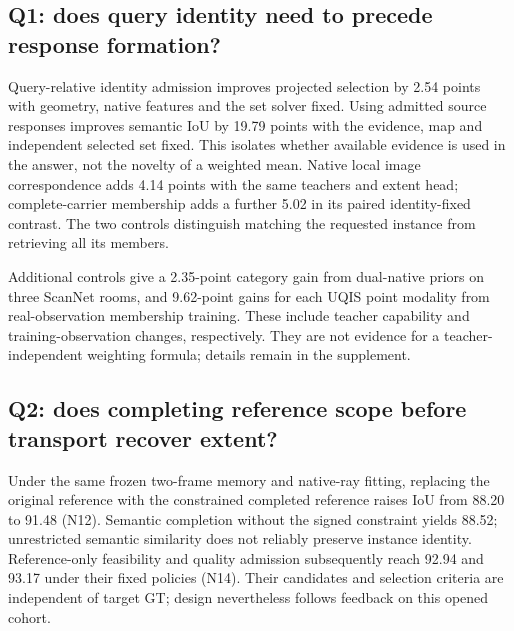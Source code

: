 \subsection{Q1: does query identity need to precede response formation?}
\begin{table}[ht]
\centering\small\resizebox{\linewidth}{!}{}
\caption{Historical matched component controls in our method. The first two
rows measure LERF selected projection and semantic IoU, respectively; the last
two measure UQIS actual image-instance IoU. These interventions are non-additive
and are not final-system leave-one-module-out experiments.}
\label{tab:core-components}
\end{table}
Query-relative identity admission improves projected selection by 2.54 points
with geometry, native features and the set solver fixed. Using admitted source
responses improves semantic IoU by 19.79 points with the evidence, map and
independent selected set fixed. This isolates whether available evidence is
used in the answer, not the novelty of a weighted mean.
Native local image correspondence adds 4.14 points with the same teachers and
extent head; complete-carrier membership adds a further 5.02 in its paired
identity-fixed contrast. The two controls distinguish matching the requested
instance from retrieving all its members.

Additional controls give a 2.35-point category gain from dual-native priors on
three ScanNet rooms, and 9.62-point gains for each UQIS point modality from
real-observation membership training. These include teacher capability and
training-observation changes, respectively. They are not evidence for a
teacher-independent weighting formula; details remain in the supplement.

\subsection{Q2: does completing reference scope before transport recover extent?}
\begin{table}[ht]
\centering\small
\caption{Reference-scope interventions on all eight NVOS tasks, retained GT.
Each paired row keeps its downstream propagation, fusion, geometry and readout
fixed. Completion introduces signed reference evidence and DINOv2 into response
construction; it is a mechanism bundle, not an isolated teacher ablation.
Source-only fitting excludes target-image evidence.}
\label{tab:reference-scope}
\end{table}
Under the same frozen two-frame memory and native-ray fitting, replacing the
original reference with the constrained completed reference raises IoU from
88.20 to 91.48 (N12). Semantic completion without the signed constraint yields
88.52; unrestricted semantic similarity does not reliably preserve instance
identity. Reference-only feasibility and quality admission subsequently reach
92.94 and 93.17 under their fixed policies (N14). Their candidates and selection
criteria are independent of target GT; design nevertheless follows feedback
on this opened cohort.

